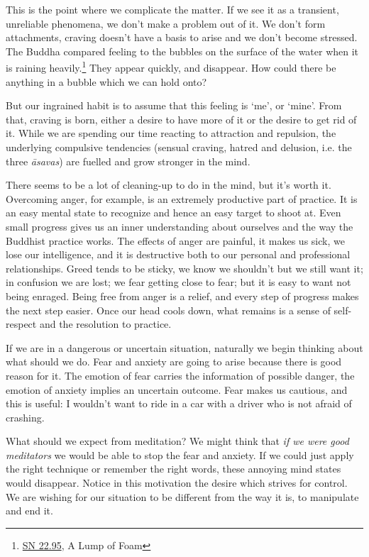 
This is the point where we complicate the matter. If we see it as a
transient, unreliable phenomena, we don't make a problem out of it. We
don't form attachments, craving doesn't have a basis to arise and we
don't become stressed. The Buddha compared feeling to the bubbles on the
surface of the water when it is raining heavily.\footnote{\href{https://suttacentral.net/sn22.95}{SN
  22.95}, A Lump of Foam} They appear quickly, and disappear. How could
there be anything in a bubble which we can hold onto?

But our ingrained habit is to assume that this feeling is `me', or
`mine'. From that, craving is born, either a desire to have more of it
or the desire to get rid of it. While we are spending our time reacting
to attraction and repulsion, the underlying compulsive tendencies
(sensual craving, hatred and delusion, i.e. the three \emph{āsavas}) are
fuelled and grow stronger in the mind.

There seems to be a lot of cleaning-up to do in the mind, but it's worth
it. Overcoming anger, for example, is an extremely productive part of
practice. It is an easy mental state to recognize and hence an easy
target to shoot at. Even small progress gives us an inner understanding
about ourselves and the way the Buddhist practice works. The effects of
anger are painful, it makes us sick, we lose our intelligence, and it is
destructive both to our personal and professional relationships. Greed
tends to be sticky, we know we shouldn't but we still want it; in
confusion we are lost; we fear getting close to fear; but it is easy to
want not being enraged. Being free from anger is a relief, and every
step of progress makes the next step easier. Once our head cools down,
what remains is a sense of self-respect and the resolution to practice.


If we are in a dangerous or uncertain situation, naturally we begin
thinking about what should we do. Fear and anxiety are going to arise
because there is good reason for it. The emotion of fear carries the
information of possible danger, the emotion of anxiety implies an
uncertain outcome. Fear makes us cautious, and this is useful: I
wouldn't want to ride in a car with a driver who is not afraid of
crashing.

What should we expect from meditation? We might think that \emph{if we
were good meditators} we would be able to stop the fear and anxiety. If
we could just apply the right technique or remember the right words,
these annoying mind states would disappear. Notice in this motivation
the desire which strives for control. We are wishing for our situation
to be different from the way it is, to manipulate and end it.

